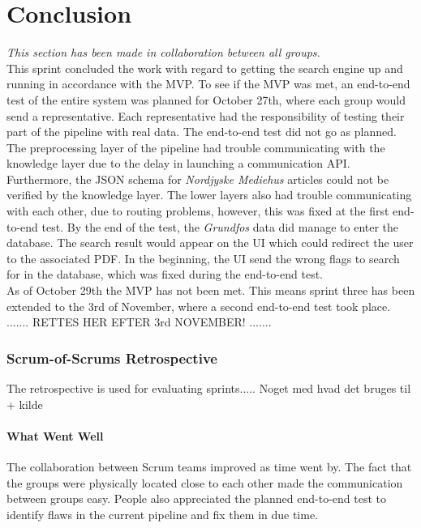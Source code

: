 \chapter{Conclusion}
\textit{This section has been made in collaboration between all groups.} \\

\noindent This sprint concluded the work with regard to getting the search engine up and running in accordance with the MVP. To see if the MVP was met, an end-to-end test of the entire system was planned for October 27th, where each group would send a representative. Each representative had the responsibility of testing their part of the pipeline with real data. The end-to-end test did not go as planned. The preprocessing layer of the pipeline had trouble communicating with the knowledge layer due to the delay in launching a communication API. Furthermore, the JSON schema for \textit{Nordjyske Mediehus} articles could not be verified by the knowledge layer.
The lower layers also had trouble communicating with each other, due to routing problems, however, this was fixed at the first end-to-end test. By the end of the test, the \textit{Grundfos} data did manage to enter the database. The search result would appear on the UI which could redirect the user to the associated PDF. In the beginning, the UI send the wrong flags to search for in the database, which was fixed during the end-to-end test.\\

\noindent As of October 29th the MVP has not been met. This means sprint three has been extended to the 3rd of November, where a second end-to-end test took place. \\
.......
RETTES HER EFTER 3rd NOVEMBER!
.......
\subsection{Scrum-of-Scrums Retrospective}
The retrospective is used for evaluating sprints.....
Noget med hvad det bruges til + kilde

\subsubsection{What Went Well}
The collaboration between Scrum teams improved as time went by. The fact that the groups were physically located close to each other made the communication between groups easy. People also appreciated the planned end-to-end test to identify flaws in the current pipeline and fix them in due time.

